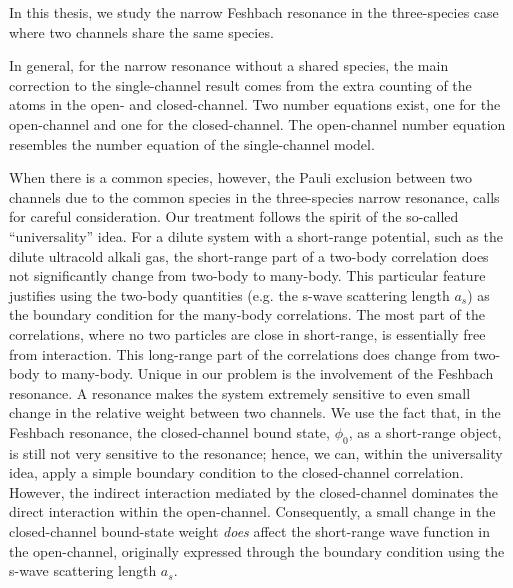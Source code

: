 % 
In this thesis, we study the narrow Feshbach resonance in  the three-species case where two channels share the same species.  

In general, for the narrow resonance without a shared species, the main correction to the single-channel result comes from the  extra counting of the atoms in the open- and closed-channel.  Two number equations exist, one for the open-channel and one for the closed-channel.  The open-channel number equation resembles the number equation of the single-channel model.

When there is a common species,  however, the  Pauli exclusion between two channels due to the common species in the three-species narrow resonance, calls for careful  consideration.  Our treatment follows the spirit of the so-called ``universality'' idea.  For a dilute system with a short-range potential, such as the dilute ultracold alkali gas, the short-range part of a two-body correlation does not significantly change from two-body  to many-body.  This particular feature justifies using the two-body quantities (e.g. the s-wave scattering length $a_{s}$) as the boundary condition for the many-body correlations.  The most part of the correlations, where no two particles are close in short-range, is essentially free from interaction. This long-range part of the correlations does change from two-body to many-body.  Unique in our problem is the involvement of the Feshbach resonance.  A resonance makes the system extremely sensitive to even small change in the relative weight between two channels. We use the fact that,  in the Feshbach resonance, the closed-channel bound state, $\phi_{0}$, as a short-range object,  is still not very sensitive to the resonance; hence, we can, within the universality idea,  apply a simple boundary condition to the closed-channel correlation. However, the indirect interaction mediated by the closed-channel dominates the direct interaction within the open-channel. Consequently, a small change in the closed-channel bound-state weight \emph{does} affect the short-range wave function in the open-channel, originally expressed through the boundary condition using the s-wave scattering length $a_{s}$. 


